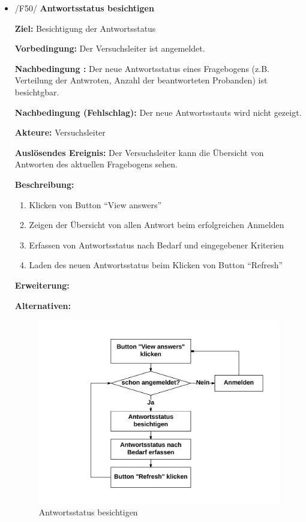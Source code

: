 \documentclass[a4paper]{scrreprt}
\begin{document}
\begin{itemize}
                \item /F50/ \textbf{Antwortsstatus besichtigen}
                \par \textbf{Ziel: }Besichtigung der Antwortsstatus
                \par \textbf{Vorbedingung: }Der Versuchsleiter ist angemeldet.
                \par \textbf{Nachbedingung : }Der neue Antwortsstatus eines Fragebogens (z.B. Verteilung der Antwroten, Anzahl der beantworteten Probanden) ist besichtgbar.
                \par \textbf{Nachbedingung (Fehlschlag): }Der neue Antwortsstauts wird nicht gezeigt.
                \par \textbf{Akteure: }Versuchsleiter
                \par \textbf{Auslösendes Ereignis: }Der Versuchsleiter kann die \"Ubersicht von Antworten des aktuellen Fragebogens sehen.
                \par \textbf{Beschreibung: }
                \begin{enumerate}
                    \item Klicken von Button ``View answers''
                    \item Zeigen der \"Ubersicht von allen Antwort beim erfolgreichen Anmelden
                    \item Erfassen von Antwortsstatus nach Bedarf und eingegebener Kriterien
                    \item Laden des neuen Antwortsstatus beim Klicken von Button ``Refresh''
                \end{enumerate}
                \par \textbf{Erweiterung: }
                \par \textbf{Alternativen: }
                \begin{figure}[ht]
                    \centering
                    \includegraphics[scale=0.8]{Antwortsstatus_besichtigen.jpeg}
                    \caption{Antwortsstatus besichtigen}
                \end{figure}



\end{itemize}
\end{document}
